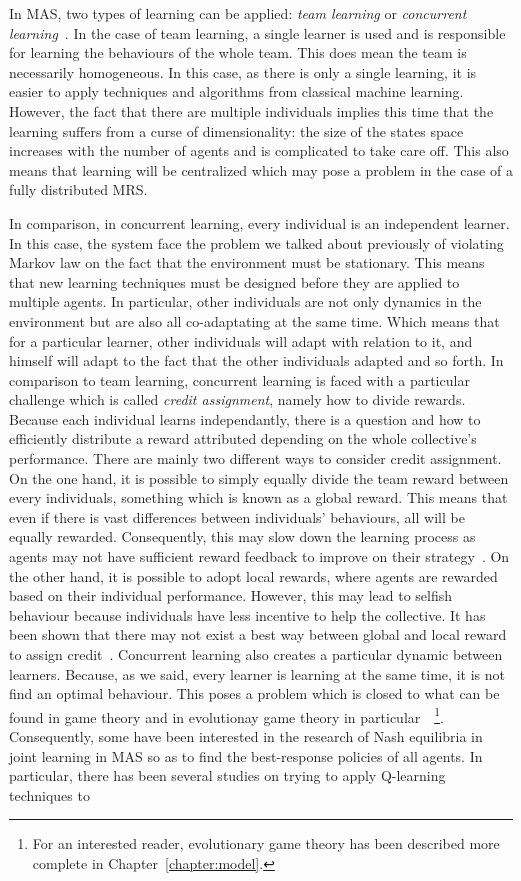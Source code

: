     In MAS, two types of learning can be applied: \emph{team learning} or \emph{concurrent learning}~\cite{Panait2005}. In the case of team learning, a single learner is used and is responsible for learning the behaviours of the whole team. This does mean the team is necessarily homogeneous. In this case, as there is only a single learning, it is easier to apply techniques and algorithms from classical machine learning. However, the fact that there are multiple individuals implies this time that the learning suffers from a curse of dimensionality: the size of the states space increases with the number of agents and is complicated to take care off. This also means that learning will be centralized which may pose a problem in the case of a fully distributed MRS. 

    In comparison, in concurrent learning, every individual is an independent learner. In this case, the system face the problem we talked about previously of violating Markov law on the fact that the environment must be stationary. This means that new learning techniques must be designed before they are applied to multiple agents. In particular, other individuals are not only dynamics in the environment but are also all co-adaptating at the same time. Which means that for a particular learner, other individuals will adapt with relation to it, and himself will adapt to the fact that the other individuals adapted and so forth. In comparison to team learning, concurrent learning is faced with a particular challenge which is called \emph{credit assignment}, namely how to divide rewards. Because each individual learns independantly, there is a question and how to efficiently distribute a reward attributed depending on the whole collective's performance. There are mainly two different ways to consider credit assignment. On the one hand, it is possible to simply equally divide the team reward between every individuals, something which is known as a global reward. This means that even if there is vast differences between individuals' behaviours, all will be equally rewarded. Consequently, this may slow down the learning process as agents may not have sufficient reward feedback to improve on their strategy~\cite{Wolpert2001}. On the other hand, it is possible to adopt local rewards, where agents are rewarded based on their individual performance. However, this may lead to selfish behaviour because individuals have less incentive to help the collective. It has been shown that there may not exist a best way between global and local reward to assign credit~\cite{Balch1999}. Concurrent learning also creates a particular dynamic between learners. Because, as we said, every learner is learning at the same time, it is not find an optimal behaviour. This poses a problem which is closed to what can be found in game theory and in evolutionay game theory in particular~\cite{MaynardSmith1973, Fudenberg1998}~\footnote{For an interested reader, evolutionary game theory has been described more complete in Chapter~\ref{chapter:model}.}. Consequently, some have been interested in the research of Nash equilibria in joint learning in MAS so as to find the best-response policies of all agents. In particular, there has been several studies on trying to apply Q-learning techniques to 